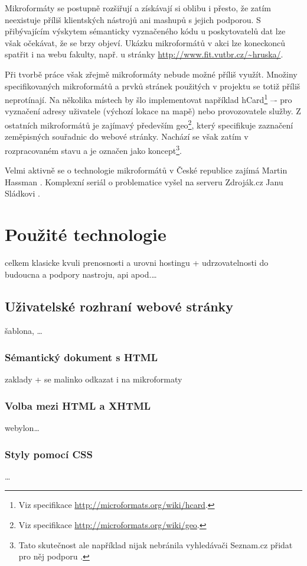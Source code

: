 Mikroformáty se postupně rozšiřují a získávají si oblibu i přesto, že
zatím neexistuje příliš klientských nástrojů ani mashupů s jejich
podporou. S přibývajícím výskytem sémanticky vyznačeného kódu u
poskytovatelů dat lze však očekávat, že se brzy objeví. Ukázku
mikroformátů v akci lze koneckonců spatřit i na webu
fakulty, např. u stránky \url{http://www.fit.vutbr.cz/~hruska/}.

Při tvorbě práce však zřejmě mikroformáty nebude možné příliš využít.
Množiny specifikovaných mikroformátů a prvků stránek použitých v
projektu se totiž příliš neprotínají. Na několika místech by šlo
implementovat například
hCard\footnote{Viz
specifikace \url{http://microformats.org/wiki/hcard}.} –- pro
vyznačení adresy uživatele (výchozí lokace na mapě) nebo provozovatele služby. Z ostatních mikroformátů je zajímavý především
geo\footnote{Viz specifikace \url{http://microformats.org/wiki/geo}.},
který specifikuje zaznačení zeměpisných souřadnic do webové stránky.
Nachází se však zatím v rozpracovaném stavu a je označen jako
koncept\footnote{Tato skutečnost ale například nijak nebránila vyhledávači Seznam.cz
přidat pro něj podporu \cite{geoSeznam}.}.

Velmi aktivně se o technologie mikroformátů v České republice zajímá
Martin Hassman \cite{mfLupa}. Komplexní seriál o problematice vyšel
na serveru Zdroják.cz Janu Sládkovi \cite{mf}.

\chapter{Použité technologie}
celkem klasicke kvuli prenosnosti a urovni hostingu +
udrzovatelnosti do budoucna a podpory nastroju, api apod.\ldots

\section{Uživatelské rozhraní webové stránky}
šablona, \ldots
\subsection{Sémantický dokument s HTML}
zaklady + se malinko odkazat i na mikroformaty

\subsection{Volba mezi HTML a XHTML}
webylon\ldots

\subsection{Styly pomocí CSS}
\ldots

